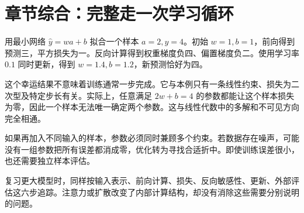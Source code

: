 \section*{章节综合：完整走一次学习循环}
用最小网络 $\hat y=wa+b$ 拟合一个样本 $a=2,y=4$。初始 $w=1,b=1$，前向得到预测三，平方损失为一。反向计算得到权重梯度负四、偏置梯度负二。使用学习率 $0.1$ 同时更新，得到 $w=1.4,b=1.2$，新预测恰好为四。

这个幸运结果不意味着训练通常一步完成。它与本例只有一条线性约束、损失为二次型及特定步长有关。实际上，任意满足 $2w+b=4$ 的参数都能让这个样本损失为零，因此一个样本无法唯一确定两个参数。这与线性代数中的多解和不可见方向完全相通。

如果再加入不同输入的样本，参数必须同时兼顾多个约束。若数据存在噪声，可能没有一组参数把所有误差都消成零，优化转为寻找合适折中。即使训练误差很小，也还需要独立样本评估。

复习更大模型时，同样按输入表示、前向计算、损失、反向敏感性、更新、外部评估这六步追踪。注意力或扩散改变了内部计算结构，却没有消除这些需要分别说明的问题。
